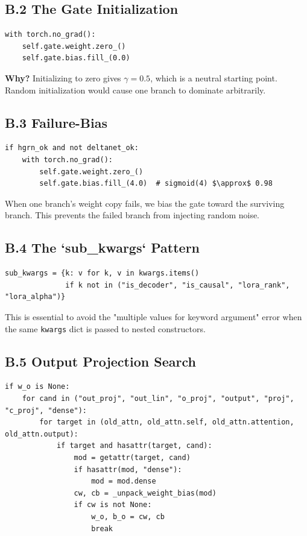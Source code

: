 \subsection{B.2 The Gate Initialization}

\begin{lstlisting}
with torch.no_grad():
    self.gate.weight.zero_()
    self.gate.bias.fill_(0.0)
\end{lstlisting}

\textbf{Why?} Initializing to zero gives $\gamma = 0.5$, which is a neutral 
starting point. Random initialization would cause one branch to dominate 
arbitrarily.

\subsection{B.3 Failure-Bias}

\begin{lstlisting}
if hgrn_ok and not deltanet_ok:
    with torch.no_grad():
        self.gate.weight.zero_()
        self.gate.bias.fill_(4.0)  # sigmoid(4) $\approx$ 0.98
\end{lstlisting}

When one branch's weight copy fails, we bias the gate toward the surviving 
branch. This prevents the failed branch from injecting random noise.

\subsection{B.4 The `sub\_kwargs` Pattern}

\begin{lstlisting}
sub_kwargs = {k: v for k, v in kwargs.items() 
              if k not in ("is_decoder", "is_causal", "lora_rank", "lora_alpha")}
\end{lstlisting}

This is essential to avoid the "multiple values for keyword argument" error 
when the same \texttt{kwargs} dict is passed to nested constructors.

\subsection{B.5 Output Projection Search}

\begin{lstlisting}
if w_o is None:
    for cand in ("out_proj", "out_lin", "o_proj", "output", "proj", "c_proj", "dense"):
        for target in (old_attn, old_attn.self, old_attn.attention, old_attn.output):
            if target and hasattr(target, cand):
                mod = getattr(target, cand)
                if hasattr(mod, "dense"):
                    mod = mod.dense
                cw, cb = _unpack_weight_bias(mod)
                if cw is not None:
                    w_o, b_o = cw, cb
                    break
\end{lstlisting}

